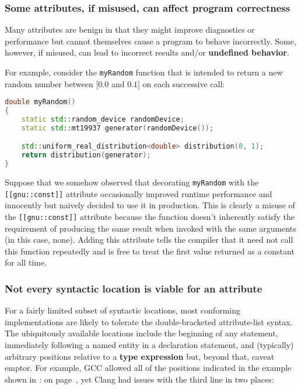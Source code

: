 \subsubsection[Some attributes, if misused, can affect program correctness]{Some attributes, if misused, can affect program correctness}\label{some-attributes,-if-misused,-can-affect-program-correctness}

Many attributes are benign in that they might improve diagnostics or
performance but cannot themselves cause a program to behave incorrectly.
Some, however, if misused, can lead to incorrect
results and/or \textbf{undefined behavior}.

For example, consider the \texttt{myRandom} function that is intended to
return a new random number between $[0.0$ and $0.1]$ on each successive
call:

\begin{lstlisting}[language=C++]
double myRandom()
{
    static std::random_device randomDevice;
    static std::mt19937 generator(randomDevice());

    std::uniform_real_distribution<double> distribution(0, 1);
    return distribution(generator);
}
\end{lstlisting}
    
\noindent Suppose that we somehow observed that decorating \texttt{myRandom} with
the \texttt{[[gnu::const]]} attribute occasionally improved runtime
performance and innocently but naively decided to use it in production. This
is clearly a misuse of the \texttt{[[gnu::const]]} attribute because the
function doesn't inherently satisfy the requirement of producing the
same result when invoked with the same arguments (in this case, none).
Adding this attribute tells the compiler that it need not call this
function repeatedly and is free to treat the first value returned as a
constant for all time.

\subsubsection[Not every syntactic location is viable for an attribute]{Not every syntactic location is viable for an attribute}\label{not-every-syntactic-location-is-viable-for-an-attribute}

For a fairly limited subset of syntactic locations, most
conforming implementations are likely to tolerate the double-bracketed
attribute-list syntax. The ubiquitously available locations include the
beginning of any statement, immediately following a named entity in a
declaration statement, and (typically) arbitrary positions relative to a
\textbf{type expression} but, beyond that, caveat emptor. For example, GCC
allowed all of the positions indicated in the example shown in
{\it{}:} {\it{}} on page~\pageref{attribute-gcc-example}, yet Clang had
issues with the third line in two places:


